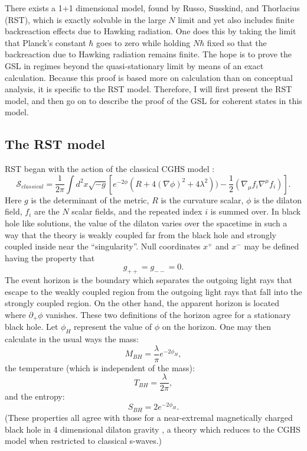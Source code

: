 \documentclass[12pt]{article}
\begin{document}
There exists a 1+1 dimensional model, found by Russo, Susskind, and Thorlacius (RST), which is exactly solvable in the large $N$ limit and yet also includes finite backreaction effects due to Hawking radiation.  One does this by taking the limit that Planck's constant $\hbar$ goes to zero while holding $N \hbar$ fixed so that the backreaction due to Hawking radiation remains finite.  The hope is to prove the GSL in regimes beyond the quasi-stationary limit by means of an exact calculation.  Because this proof is based more on calculation than on conceptual analysis, it is specific to the RST model.  Therefore, I will first present the RST model, and then go on to describe the proof of the GSL for coherent states in this model.

\subsection{The RST model}

RST \cite{RST92} began with the action of the classical CGHS model \cite{CGHS91}:
\begin{equation}
\mathcal{S}_{classical} = \frac{1}{2\pi}\int d^2x \sqrt{-g}
\left[ e^{-2\phi}(R + 4(\nabla \phi)^2 +4\lambda^2))
- \frac{1}{2}(\nabla_{\mu} f_i \nabla^{\mu} f_i) \right].
\end{equation}
Here $g$ is the determinant of the metric, $R$ is the curvature scalar, $\phi$ is the dilaton field, $f_i$ are the $N$ scalar fields, and the repeated index $i$ is summed over.  In black hole like solutions, the value of the dilaton varies over the spacetime in such a way that the theory is weakly coupled far from the black hole and strongly coupled inside near the ``singularity''.  Null coordinates $x^+$ and $x^-$ may be defined having the property that
\begin{equation}
g_{++} = g_{--} = 0.
\end{equation}
The event horizon is the boundary which separates the outgoing light rays that escape to the weakly coupled region from the outgoing light rays that fall into the strongly coupled region.   On the other hand, the apparent horizon is located where $\partial_{+}\phi$ vanishes.  These two definitions of the horizon agree for a stationary black hole.  Let $\phi_H$ represent the value of $\phi$ on the horizon.  One may then calculate in the usual ways the mass:
\begin{equation}\label{CGHS}
M_{BH} = \frac{\lambda}{\pi}e^{-2\phi_H},
\end{equation}
the temperature (which is independent of the mass):
\begin{equation}
T_{BH} = \frac{\lambda}{2\pi},
\end{equation}
and the entropy:
\begin{equation}\label{2dBH}
S_{BH} = 2e^{-2\phi_H}.
\end{equation}
(These properties all agree with those for a near-extremal magnetically charged black hole in 4 dimensional dilaton gravity \cite{GM88}, a theory which reduces to the CGHS model when restricted to classical s-waves.)
\end{document}
